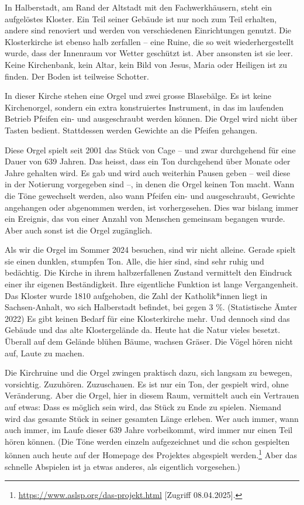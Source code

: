 \documentclass[a4paper,
fontsize=11pt,
oneside,
numbers=noperiodatend,
parskip=half-,
bibliography=totoc,
final
]{scrartcl}
\begin{document}
In Halberstadt, am Rand der Altstadt mit den Fachwerkhäusern, steht ein
aufgelöstes Kloster. Ein Teil seiner Gebäude ist nur noch zum Teil
erhalten, andere sind renoviert und werden von verschiedenen
Einrichtungen genutzt. Die Klosterkirche ist ebenso halb zerfallen --
eine Ruine, die so weit wiederhergestellt wurde, dass der Innenraum vor
Wetter geschützt ist. Aber ansonsten ist sie leer. Keine Kirchenbank,
kein Altar, kein Bild von Jesus, Maria oder Heiligen ist zu finden. Der
Boden ist teilweise Schotter.

In dieser Kirche stehen eine Orgel und zwei grosse Blasebälge. Es ist
keine Kirchenorgel, sondern ein extra konstruiertes Instrument, in das
im laufenden Betrieb Pfeifen ein- und ausgeschraubt werden können. Die
Orgel wird nicht über Tasten bedient. Stattdessen werden Gewichte an die
Pfeifen gehangen.

Diese Orgel spielt seit 2001 das Stück von Cage -- und zwar durchgehend
für eine Dauer von 639 Jahren. Das heisst, dass ein Ton durchgehend über
Monate oder Jahre gehalten wird. Es gab und wird auch weiterhin Pausen
geben -- weil diese in der Notierung vorgegeben sind --, in denen die
Orgel keinen Ton macht. Wann die Töne gewechselt werden, also wann
Pfeifen ein- und ausgeschraubt, Gewichte angehangen oder abgenommen
werden, ist vorhergesehen. Dies war bislang immer ein Ereignis, das von
einer Anzahl von Menschen gemeinsam begangen wurde. Aber auch sonst ist
die Orgel zugänglich.

Als wir die Orgel im Sommer 2024 besuchen, sind wir nicht alleine.
Gerade spielt sie einen dunklen, stumpfen Ton. Alle, die hier sind, sind
sehr ruhig und bedächtig. Die Kirche in ihrem halbzerfallenen Zustand
vermittelt den Eindruck einer ihr eigenen Beständigkeit. Ihre
eigentliche Funktion ist lange Vergangenheit. Das Kloster wurde 1810
aufgehoben, die Zahl der Katholik*innen liegt in Sachsen-Anhalt, wo sich
Halberstadt befindet, bei gegen 3 \%. (Statistische Ämter 2022) Es gibt
keinen Bedarf für eine Klosterkirche mehr. Und dennoch sind das Gebäude
und das alte Klostergelände da. Heute hat die Natur vieles besetzt.
Überall auf dem Gelände blühen Bäume, wachsen Gräser. Die Vögel hören
nicht auf, Laute zu machen.

Die Kirchruine und die Orgel zwingen praktisch dazu, sich langsam zu
bewegen, vorsichtig. Zuzuhören. Zuzuschauen. Es ist nur ein Ton, der
gespielt wird, ohne Veränderung. Aber die Orgel, hier in diesem Raum,
vermittelt auch ein Vertrauen auf etwas: Dass es möglich sein wird, das
Stück zu Ende zu spielen. Niemand wird das gesamte Stück in seiner
gesamten Länge erleben. Wer auch immer, wann auch immer, im Laufe dieser
639 Jahre vorbeikommt, wird immer nur einen Teil hören können. (Die Töne
werden einzeln aufgezeichnet und die schon gespielten können auch heute
auf der Homepage des Projektes abgespielt werden.\footnote{\url{https://www.aslsp.org/das-projekt.html}
  {[}Zugriff 08.04.2025{]}.} Aber das schnelle Abspielen ist ja etwas
anderes, als eigentlich vorgesehen.)
\end{document}
